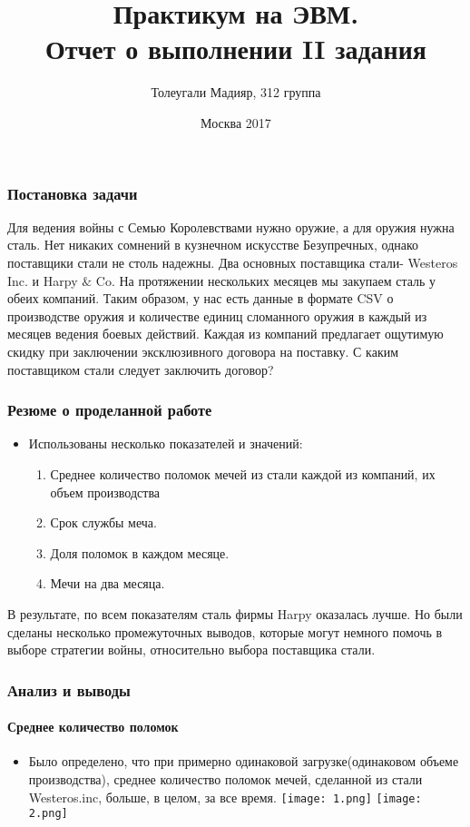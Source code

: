 \documentclass[8pt,pdf,hyperref={unicode}]{beamer}
\title{Практикум на ЭВМ.\\Отчет о выполнении II задания}
\institute{Московский Государственный Университет М.В Ломоносова\\
					Факультет Вычислительной математики и Кибернетики\\
						Кафедра Исследования Операций\\}
\author{Толеугали Мадияр, 312 группа}
\date{Москва 2017}
\begin{document}
	\begin{frame}
		\titlepage
	\end{frame}
	
	\begin{frame}	
		\frametitle{Постановка задачи}
Для ведения войны с Семью Королевствами нужно оружие, а для оружия нужна сталь. Нет никаких сомнений в кузнечном искусстве Безупречных, однако поставщики стали не столь надежны.
Два основных поставщика стали- Westeros Inc. и Harpy $\&$ Co. На протяжении нескольких месяцев мы закупаем сталь у обеих компаний.  Таким образом, у нас есть данные в формате CSV о производстве оружия и количестве единиц сломанного оружия в каждый из месяцев ведения боевых действий.  
Каждая из компаний предлагает ощутимую скидку при заключении эксклюзивного договора на поставку. С каким поставщиком стали следует заключить договор?
	\end{frame}
	
	\begin{frame}
		\frametitle{ Резюме о проделанной работе }
		\begin{itemize}
		\item Использованы несколько показателей и значений:\\
		\begin{enumerate}
			\item Среднее количество поломок мечей из стали каждой из компаний, их объем производства\\
			\item Срок службы меча. 
			\item Доля поломок в каждом месяце.
			\item Мечи на два месяца.

		\end{enumerate}
		\end{itemize}	
		В результате, по всем показателям сталь фирмы Harpy оказалась лучше. Но были сделаны несколько промежуточных выводов, которые могут немного помочь в выборе стратегии войны, относительно выбора поставщика стали.		
	\end{frame}		
		
	\begin{frame}
	\frametitle{Анализ и выводы}
	\framesubtitle{Среднее количество поломок}
		\begin{itemize}
			\item  Было определено, что при примерно одинаковой загрузке(одинаковом объеме производства), среднее количество поломок мечей, сделанной из стали Westeros.inc, больше, в целом, за все время.
			\texttt{[image: 1.png]}
			\texttt{[image: 2.png]} 
		\end{itemize}
	\end{frame}
			
\end{document}
